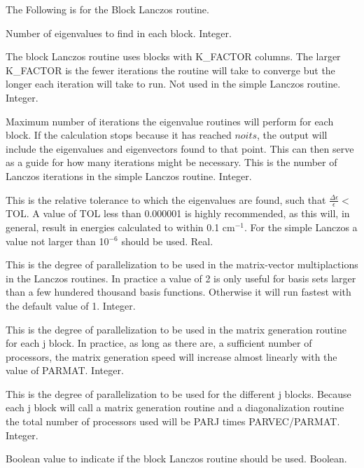 \documentclass{article}
\newcommand{\wn}{cm$^{-1}$}
\begin{document}
\begin{description}
\item The Following is for the Block Lanczos routine.

\item[M] Number of eigenvalues to find in each block. Integer.

\item[K\_FACTOR] The block Lanczos routine uses blocks with 
  K\_FACTOR columns. The larger K\_FACTOR is the fewer iterations
  the routine will take to converge but the longer each iteration
  will take to run. Not used in the simple Lanczos routine. Integer.

\item[NOITS] Maximum number of iterations the eigenvalue routines
  will perform for each block. If the calculation stops because it has
  reached $noits$, the output will include the eigenvalues and
  eigenvectors found to that point. This can then serve as a guide for
  how many iterations might be necessary. This is the number of Lanczos
  iterations in the simple Lanczos routine. Integer.

\item[TOL] This is the relative tolerance to which
  the eigenvalues are found, such that $\frac{\Delta \epsilon
    }{\epsilon } < $TOL. A value of TOL less than 0.000001 is highly
  recommended, as this will, in general, result in energies calculated
  to within 0.1 \wn . For the simple Lanczos a value not larger than 10$^{-6}$
  should be used. Real.
  
\item[PARVEC] This is the degree of parallelization to be used in
  the matrix-vector multiplactions in the Lanczos routines. In 
  practice a value of 2 is only useful for basis sets larger than
  a few hundered thousand basis functions. Otherwise it will run
  fastest with the default value of 1. Integer.

\item[PARMAT] This is the degree of parallelization to be used in
  the matrix generation routine for each j block. In practice, as long as there are,
  a sufficient number of processors, the matrix generation speed 
  will increase almost linearly with the value of PARMAT. Integer.

\item[PARJ] This is the degree of parallelization to be used for
  the different j blocks.  Because each j block will call a matrix
  generation routine and a diagonalization routine the total number
  of processors used will be PARJ times PARVEC/PARMAT. Integer.

\item[BLOCK\_LANCZOS] Boolean value to indicate if the block Lanczos
  routine should be used. Boolean.

\end{description}
\end{document}
